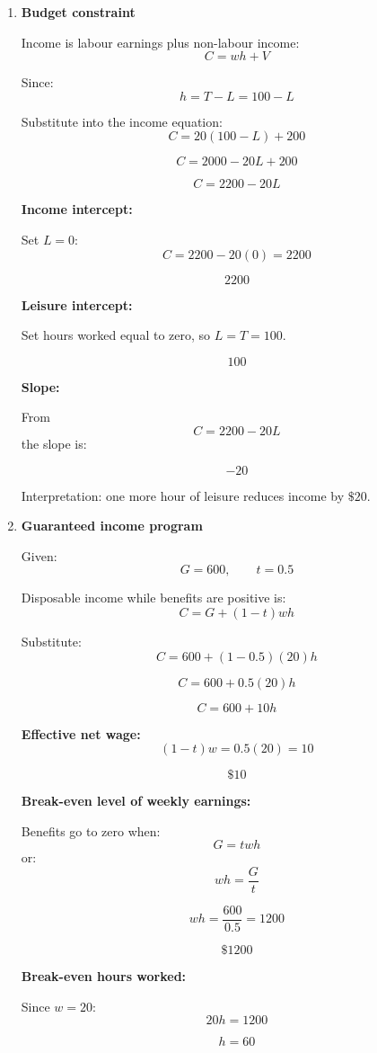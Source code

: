 \documentclass[12pt]{article}
\begin{document}
\begin{enumerate}[label=(\alph*)]

\item \textbf{Budget constraint}

Income is labour earnings plus non-labour income:
\[
C=wh+V
\]

Since:
\[
h=T-L=100-L
\]

Substitute into the income equation:
\[
C=20(100-L)+200
\]

\[
C=2000-20L+200
\]

\[
\boxed{C=2200-20L}
\]

\textbf{Income intercept:}

Set \(L=0\):
\[
C=2200-20(0)=2200
\]

\[
\boxed{2200}
\]

\textbf{Leisure intercept:}

Set hours worked equal to zero, so \(L=T=100\).

\[
\boxed{100}
\]

\textbf{Slope:}

From
\[
C=2200-20L
\]
the slope is:

\[
\boxed{-20}
\]

Interpretation: one more hour of leisure reduces income by \(\$20\).


\item \textbf{Guaranteed income program}

Given:
\[
G=600,\qquad t=0.5
\]

Disposable income while benefits are positive is:
\[
C=G+(1-t)wh
\]

Substitute:
\[
C=600+(1-0.5)(20)h
\]

\[
C=600+0.5(20)h
\]

\[
\boxed{C=600+10h}
\]

\textbf{Effective net wage:}
\[
(1-t)w=0.5(20)=10
\]

\[
\boxed{\$10}
\]

\textbf{Break-even level of weekly earnings:}

Benefits go to zero when:
\[
G=twh
\]
or:
\[
wh=\frac{G}{t}
\]

\[
wh=\frac{600}{0.5}=1200
\]

\[
\boxed{\$1200}
\]

\textbf{Break-even hours worked:}

Since \(w=20\):
\[
20h=1200
\]

\[
h=60
\]


\end{enumerate}
\end{document}
